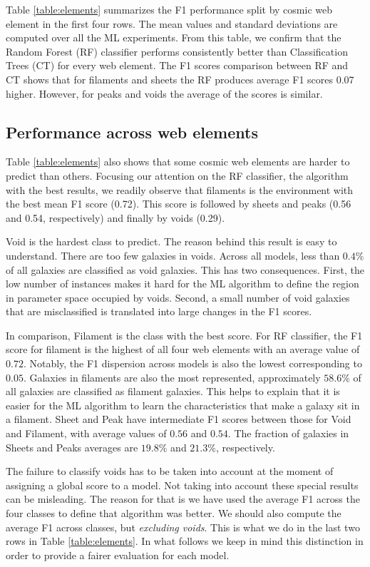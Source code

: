 \documentclass[usenatbib]{mnras}
\begin{document}
Table \ref{table:elements} summarizes the F1 performance split by cosmic
web element in the first four rows.
The mean values and standard deviations are computed over all the ML experiments. 
From this table, we confirm that the Random Forest (RF) classifier performs
consistently better than Classification Trees (CT) for every web element.
The F1 scores comparison between RF and CT shows that for filaments and
sheets the RF produces average F1 scores 0.07 higher. 
However, for peaks and voids the average of the scores is similar. 

\subsection{Performance across web elements}

Table \ref{table:elements} also shows that some cosmic web elements 
are harder to predict than others.
Focusing our attention on the RF classifier, the algorithm with the
best results, we readily observe that filaments is the environment
with the best mean F1 score (0.72).
This score is followed by sheets and peaks (0.56 and 0.54,
respectively) and finally by voids (0.29).

Void is the hardest class to predict. 
The reason behind this result is easy to understand. 
There are too few galaxies in voids.
Across all models, less than $0.4\%$ of all galaxies
are classified as void galaxies.
This has two consequences.
First, the low number of instances makes it hard for the ML algorithm to
define the region in parameter space occupied by voids.
Second, a small number of void galaxies that are misclassified is translated into large changes in the F1 scores.

In comparison, Filament is the class with the best score.
For RF classifier, the F1 score for filament is the highest of all four
web elements with an average value of  $0.72$.
Notably, the F1 dispersion across models is also the lowest
corresponding to $0.05$.
Galaxies in filaments are also the most represented,
approximately $58.6\%$ of all galaxies are classified as filament galaxies.
This helps to explain that it is easier for the ML algorithm to learn
the characteristics that make a galaxy sit in a filament.
Sheet and Peak have intermediate F1 scores between
those for Void and Filament, with average values of $0.56$ and $0.54$.
The fraction of galaxies in Sheets and Peaks averages are $19.8\%$ and $21.3\%$, respectively. 

The failure to classify voids has to be taken into account at the
moment of assigning a global score to a model.
Not taking into account these special results can be misleading.
The reason for that is we have used the average F1 across the
four classes to define that algorithm was better. 
We should also compute the average F1 across classes, but
\emph{excluding voids}.
This is what we do in the last two rows in Table \ref{table:elements}.
In what follows we keep in mind this distinction in order to provide a
fairer evaluation for each model.
\end{document}
